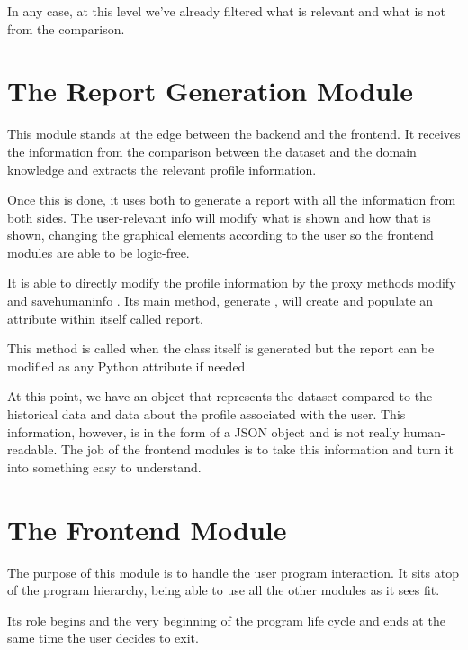 In any case, at this level we've already filtered what is relevant and what is not from the comparison.

\section{The Report Generation Module}
\label{cap3:sec:reporter}

This module stands at the edge between the backend and the frontend. It receives the information from the comparison between the dataset and the domain knowledge and extracts the relevant profile information.

Once this is done, it uses both to generate a report with all the information from both sides. The user-relevant info will modify what is shown and  how  that is shown, changing the graphical elements according to the user so the frontend modules are able to be logic-free.

It is able to directly modify the profile information by the proxy methods  modify  and  savehumaninfo . Its main method,  generate , will create and populate an attribute within itself called report.

This method is called when the class itself is generated but the report can be modified as any Python attribute if needed.

At this point, we have an object that represents the dataset compared to the historical data and data about the profile associated with the user. This information, however, is in the form of a JSON object and is not really human-readable. The job of the frontend modules is to take this information and turn it into something easy to understand.

\section{The Frontend Module}
\label{cap3:sec:frontend}

The purpose of this module is to handle the user program interaction. It sits atop of the program hierarchy, being able to use all the other modules as it sees fit.

Its role begins and the very beginning of the program life cycle and ends at the same time the user decides to exit. 

